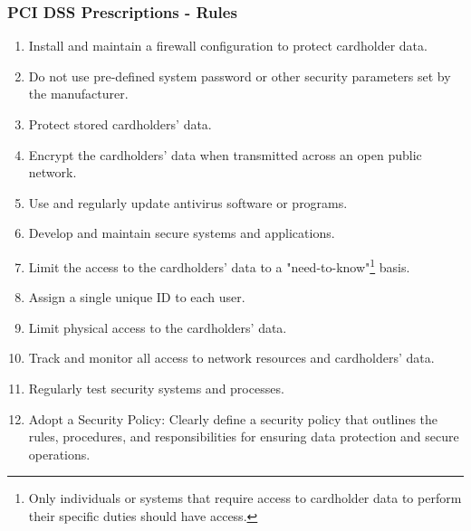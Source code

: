 \begin{center}
    \subsubsection*{PCI DSS Prescriptions - Rules}
\end{center}


    {}
\begin{enumerate}
    \item Install and maintain a firewall configuration to protect cardholder data.
    \item Do not use pre-defined system password or other security parameters set by the manufacturer.
    {}
    \item Protect stored cardholders' data.
    \item Encrypt the cardholders' data when transmitted across an open public network.
    {}
    \item Use and regularly update antivirus software or programs.
    \item Develop and maintain secure systems and applications.
    {}
    \item Limit the access to the cardholders' data to a "need-to-know"\footnote{Only individuals or systems that require access to cardholder data to perform their specific duties should have access. } basis.
    \item Assign a single unique ID to each user.
    \item Limit physical access to the cardholders' data.
    {}
    \item Track and monitor all access to network resources and cardholders' data.
    \item Regularly test security systems and processes.
    {}
    \item Adopt a Security Policy: Clearly define a security policy that outlines the rules, procedures, and responsibilities for ensuring data protection and secure operations. 
\end{enumerate}

